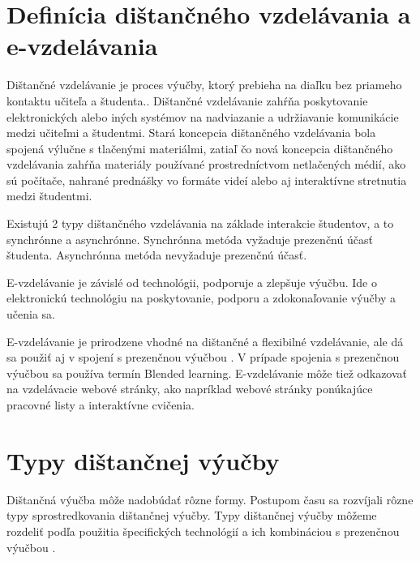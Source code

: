 \documentclass[10pt,oneside,slovak,a4paper]{article}
\begin{document}
\section{Definícia dištančného vzdelávania a e-vzdelávania}
\label{rozdiely}
Dištančné vzdelávanie je proces výučby, ktorý prebieha na diaľku bez priameho kontaktu učiteľa a študenta.\cite{India}. %
Dištančné vzdelávanie zahŕňa poskytovanie elektronických alebo iných systémov na nadviazanie a udržiavanie komunikácie medzi učiteľmi a študentmi.
Stará koncepcia dištančného vzdelávania bola spojená výlučne s tlačenými materiálmi, zatiaľ čo nová koncepcia dištančného vzdelávania zahŕňa materiály používané prostredníctvom netlačených médií, ako sú počítače, nahrané prednášky vo formáte videí alebo aj interaktívne stretnutia medzi študentmi.

Existujú 2 typy dištančného vzdelávania na základe interakcie študentov, a to synchrónne a asynchrónne. %
Synchrónna metóda vyžaduje prezenčnú účasť študenta. %
Asynchrónna metóda nevyžaduje prezenčnú účasť.

E-vzdelávanie je závislé od technológii, podporuje a zlepšuje výučbu. Ide o elektronickú technológiu na poskytovanie, podporu a zdokonaľovanie výučby a učenia sa. 

E-vzdelávanie je prirodzene vhodné na dištančné a flexibilné vzdelávanie, ale dá sa použiť aj v spojení s prezenčnou výučbou \cite{elearningDef}. %
V prípade spojenia s prezenčnou výučbou sa používa termín Blended learning. %
E-vzdelávanie môže tiež odkazovať na vzdelávacie webové stránky, ako napríklad webové stránky ponúkajúce pracovné listy a interaktívne cvičenia.

\section{Typy dištančnej výučby}
\label{typy}
Dištančná výučba môže nadobúdať rôzne formy. Postupom času sa rozvíjali rôzne typy sprostredkovania dištančnej výučby. Typy dištančnej výučby môžeme rozdeliť podľa použitia
špecifických technológií a ich kombináciou s prezenčnou výučbou \cite{WiktorzakKotowski}. %
\end{document}
